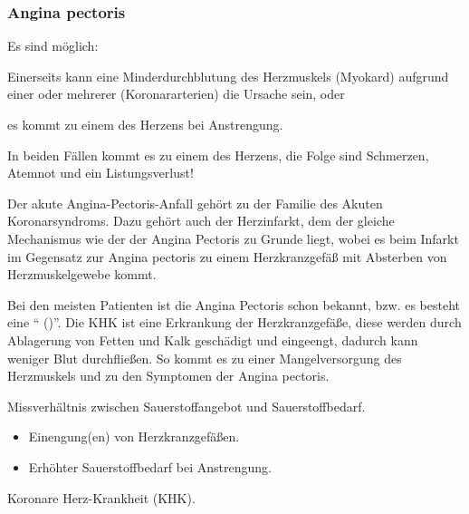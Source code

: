 \subsubsection[Angina pectoris]{Angina pectoris}


{%
Es sind  möglich: 
\begin{inparaitem}
  \item Einerseits kann eine Minderdurchblutung des Herzmuskels (Myokard)
  aufgrund einer oder mehrerer 
  (Koronararterien) die Ursache sein, oder 
  \item es kommt zu einem  des Herzens bei
  Anstrengung.
\end{inparaitem}

In beiden Fällen kommt es zu einem
 des Herzens, die Folge sind Schmerzen, Atemnot und ein
Listungsverlust!

Der akute Angina-Pectoris-Anfall gehört zu der Familie des Akuten
Koronarsyndroms. Dazu gehört auch der Herzinfarkt, dem der gleiche
Mechanismus wie der der Angina Pectoris zu Grunde liegt, wobei es beim Infarkt
im Gegensatz zur Angina pectoris zu einem 
Herzkranzgefäß mit Absterben von Herzmuskelgewebe kommt.

Bei den meisten Patienten ist die Angina Pectoris schon bekannt, bzw. es
besteht eine "`
()"'. Die KHK ist
eine Erkrankung der Herzkranzgefäße, diese werden durch
Ablagerung von Fetten und Kalk geschädigt und eingeengt, dadurch kann
weniger Blut durchfließen. So kommt es zu einer Mangelversorgung
des Herzmuskels und zu den Symptomen der Angina pectoris.  
}{
Missverhältnis zwischen Sauerstoffangebot und  
Sauerstoffbedarf.
\begin{itemize}
  \item Einengung(en) von Herzkranzgefäßen. 
  \item Erhöhter Sauerstoffbedarf bei Anstrengung. 
\end{itemize}

Koronare Herz-Krankheit (KHK).
}{}{}{}





